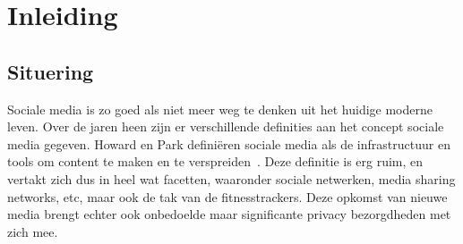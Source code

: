 
\chapter{Inleiding}

\section{Situering}
Sociale media is zo goed als niet meer weg te denken uit het huidige moderne
leven. Over de jaren heen zijn er verschillende definities aan het concept
sociale media gegeven. Howard en Park definiëren sociale media als de
infrastructuur en tools om content te maken en te
verspreiden~\cite{PhilipsAndParks}. Deze definitie is erg ruim, en vertakt zich
dus in heel wat facetten, waaronder sociale netwerken, media sharing networks,
etc, maar ook de tak van de fitnesstrackers. Deze opkomst van nieuwe media
brengt echter ook onbedoelde maar significante privacy bezorgdheden met zich
mee.

